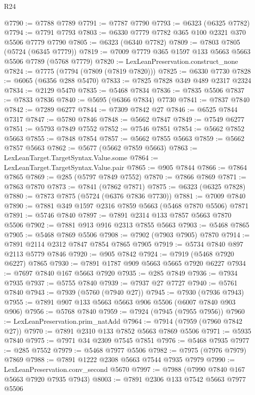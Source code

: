 \begin{lexlean}{R24}
\begin{coremodule}
@7790 := @7788 @7789
@7791 := @7787 @7790
@7793 := @6323 (@6325 @7782)
@7794 := @7791 @7793
@7803 := @6330 @7779 @7782 @365 @100 @2321 @370 @5506 @7779 @7790
@7805 := @6323 (@6340 @7782)
@7809 := @7803 @7805 (@5724 (@6345 @7779))
@7819 := @7009 @7779 @365 @1597 @133 @5663 @5663 @5506 @7789 (@5768 @7779)
@7820 := LexLeanPreservation.construct_none
@7824 := @7775 (@7794 (@7809 (@7819 @7820)))
@7825 := @6330 @7730
@7828 := @6065 (@6356 @288 @5470)
@7833 := @7825 @7828 @349 @489 @2317 @2324
@7834 := @2129 @5470
@7835 := @5468 @7834
@7836 := @7835 @5506
@7837 := @7833 @7836
@7840 := @5695 (@6366 @7834) @7730
@7841 := @7837 @7840
@7842 := @7289 @6277
@7844 := @7309 @7842 @27
@7846 := @6525 @7844 @7317
@7847 := @5780 @7846
@7848 := @5662 @7847
@7849 := @7549 @6277
@7851 := @5793 @7849 @7552
@7852 := @7546 @7851
@7854 := @5662 @7852 @5663
@7855 := @7848 @7854
@7857 := @5662 @7855 @5663
@7859 := @5662 @7857 @5663
@7862 := @5677 (@5662 @7859 @5663)
@7863 := LexLeanTarget.TargetSyntax.Value.some
@7864 := LexLeanTarget.TargetSyntax.Value.pair
@7865 := @905 @7844
@7866 := @7864 @7865
@7869 := @285 (@5797 @7849 @7552)
@7870 := @7866 @7869
@7871 := @7863 @7870
@7873 := @7841 (@7862 @7871)
@7875 := @6323 (@6325 @7828)
@7880 := @7873 @7875 (@5724 (@6376 @7836 @7730))
@7881 := @7009 @7840
@7890 := @7881 @349 @1597 @2316 @7859 @5663 (@5468 @7870 @5506) @7871
@7891 := @5746 @7840
@7897 := @7891 @2314 @133 @7857 @5663 @7870 @5506
@7902 := @7881 @913 @916 @2313 @7855 @5663
@7903 := @5468 @7865
@7905 := @5468 @7869 @5506
@7908 := @7902 (@7903 @7905) @7870
@7914 := @7891 @2114 @2312 @7847 @7854 @7865 @7905
@7919 := @5734 @7840 @897 @2113 @5779 @7846
@7920 := @905 @7842
@7924 := @7919 (@5468 @7920 @6227) @7865
@7930 := @7891 @1787 @909 @5663 @5665 @7920 @6227
@7934 := @7697 @7840 @167 @5663 @7920
@7935 := @285 @7849
@7936 := @7934 @7935
@7937 := @5755 @7840
@7939 := @7937 @27 @7727
@7940 := @5761 @7840
@7943 := @7939 (@5760 (@7940 @27))
@7945 := @7930 (@7936 @7943)
@7955 := @7891 @907 @133 @5663 @5663 @906 @5506 (@6007 @7840 @903 @906)
@7956 := @5768 @7840
@7959 := @7924 (@7945 (@7955 @7956))
@7960 := LexLeanPreservation.prim_natAdd
@7964 := @7914 (@7959 (@7960 @7842 @27))
@7970 := @7891 @2310 @133 @7852 @5663 @7869 @5506
@7971 := @5935 @7840
@7975 := @7971 @34 @2309 @7545 @7851
@7976 := @5468 @7935
@7977 := @285 @7552
@7979 := @5468 @7977 @5506
@7982 := @7975 (@7976 @7979) @7869
@7988 := @7891 @1222 @2308 @5663 @7544 @7935 @7979
@7990 := LexLeanPreservation.conv_second @5670
@7997 := @7988 (@7990 @7840 @167 @5663 @7920 @7935 @7943)
@8003 := @7891 @2306 @133 @7542 @5663 @7977 @5506

\end{coremodule}
\end{lexlean}
